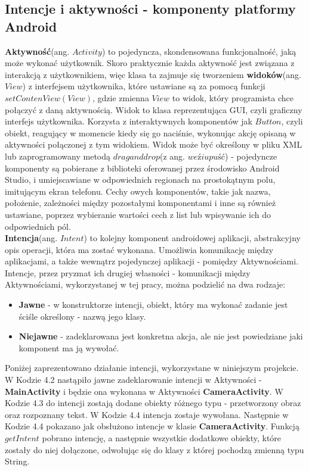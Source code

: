 \documentclass[eng,oneside]{mgr}
\begin{document}
\subsection{Intencje i aktywności - komponenty platformy Android}
\textbf{Aktywność}(ang. $Activity$) to pojedyncza, skondensowana funkcjonalność, jaką może wykonać użytkownik. Skoro praktycznie każda aktywność jest związana z interakcją z użytkownikiem, więc klasa ta zajmuje się tworzeniem \textbf{widoków}(ang. $View$) z interfejsem użytkownika, które ustawiane są za pomocą funkcji $setContenView(View)$, gdzie zmienna $View$ to widok, który programista chce połączyć z daną aktywnością\cite{activity}. Widok to klasa reprezentująca GUI, czyli graficzny interfejs użytkownika. Korzysta z interaktywnych komponentów jak $Button$, czyli obiekt, reagujący w momencie kiedy się go naciśnie, wykonując akcję opisaną w aktywności połączonej z tym widokiem\cite{view}. Widok może być określony w pliku XML lub zaprogramowany metodą $drag and drop$(z ang. $weź i upuść$) - pojedyncze komponenty są pobierane z biblioteki oferowanej przez środowisko Android Studio, i umiejscawiane w odpowiednich regionach na prostokątnym polu, imitującym ekran telefonu. Cechy owych komponentów, takie jak nazwa, położenie, zależności między pozostałymi komponentami i inne są również ustawiane, poprzez wybieranie wartości cech z list lub wpisywanie ich do odpowiednich pól. \\
\textbf{Intencja}(ang. $Intent$) to kolejny komponent androidowej aplikacji, abstrakcyjny opis operacji, która ma zostać wykonana\cite{intents}. Umożliwia komunikację między aplikacjami, a także wewnątrz pojedynczej aplikacji - pomiędzy Aktywnościami. Intencje, przez pryzmat ich drugiej własności - komunikacji między Aktywnościami, wykorzystanej w tej pracy, można podzielić na dwa rodzaje\cite{android4devs}:
\begin{itemize}
\item \textbf{Jawne} - w konstruktorze intencji, obiekt, który ma wykonać zadanie jest ściśle określony - nazwą jego klasy.
\item \textbf{Niejawne} - zadeklarowana jest konkretna akcja, ale nie jest powiedziane jaki komponent ma ją wywołać\cite{damianchodorek}.
\end{itemize}
Poniżej zaprezentowano działanie intencji, wykorzystane w niniejszym projekcie. W Kodzie 4.2 nastąpiło jawne zadeklarowanie intencji w Aktywności - \textbf{MainActivity} i będzie ona wykonana w Aktywności \textbf{CameraActivity}. W Kodzie 4.3 do intencji zostają dodane obiekty różnego typu - przetworzony obraz oraz rozpoznany tekst. W Kodzie 4.4 intencja zostaje wywołana. Następnie w Kodzie 4.4 pokazano jak obsłużono intencje w klasie \textbf{CameraActivity}. Funkcją $getIntent$ pobrano intencję, a następnie wszystkie dodatkowe obiekty, które zostały do niej dołączone, odwołując się do klasy z której pochodzą zmienną typu String. 
\end{document}
